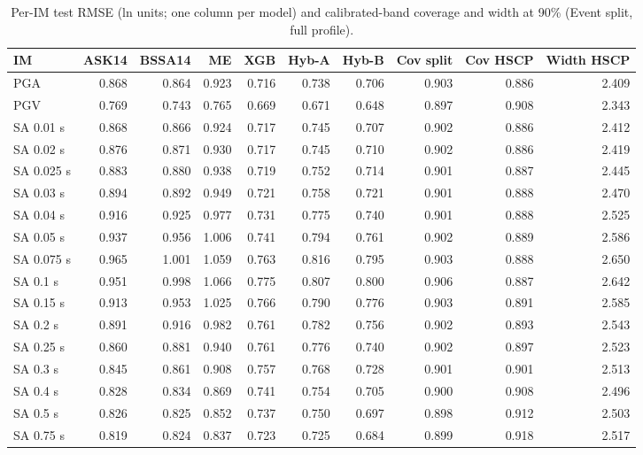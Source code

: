 \begin{table}[htbp]
\centering
\caption{Per-IM test RMSE (ln units; one column per model) and calibrated-band coverage and width at 90\% (Event split, full profile).}
\label{tab:tableS1_per_im_metrics}
\small
\begin{adjustbox}{max width=6.25in}
\begin{tabular}{lrrrrrrrrr}
\toprule
IM & ASK14 & BSSA14 & ME & XGB & Hyb-A & Hyb-B & Cov split & Cov HSCP & Width HSCP \\
\midrule
PGA & 0.868 & 0.864 & 0.923 & 0.716 & 0.738 & 0.706 & 0.903 & 0.886 & 2.409 \\
PGV & 0.769 & 0.743 & 0.765 & 0.669 & 0.671 & 0.648 & 0.897 & 0.908 & 2.343 \\
SA 0.01 s & 0.868 & 0.866 & 0.924 & 0.717 & 0.745 & 0.707 & 0.902 & 0.886 & 2.412 \\
SA 0.02 s & 0.876 & 0.871 & 0.930 & 0.717 & 0.745 & 0.710 & 0.902 & 0.886 & 2.419 \\
SA 0.025 s & 0.883 & 0.880 & 0.938 & 0.719 & 0.752 & 0.714 & 0.901 & 0.887 & 2.445 \\
SA 0.03 s & 0.894 & 0.892 & 0.949 & 0.721 & 0.758 & 0.721 & 0.901 & 0.888 & 2.470 \\
SA 0.04 s & 0.916 & 0.925 & 0.977 & 0.731 & 0.775 & 0.740 & 0.901 & 0.888 & 2.525 \\
SA 0.05 s & 0.937 & 0.956 & 1.006 & 0.741 & 0.794 & 0.761 & 0.902 & 0.889 & 2.586 \\
SA 0.075 s & 0.965 & 1.001 & 1.059 & 0.763 & 0.816 & 0.795 & 0.903 & 0.888 & 2.650 \\
SA 0.1 s & 0.951 & 0.998 & 1.066 & 0.775 & 0.807 & 0.800 & 0.906 & 0.887 & 2.642 \\
SA 0.15 s & 0.913 & 0.953 & 1.025 & 0.766 & 0.790 & 0.776 & 0.903 & 0.891 & 2.585 \\
SA 0.2 s & 0.891 & 0.916 & 0.982 & 0.761 & 0.782 & 0.756 & 0.902 & 0.893 & 2.543 \\
SA 0.25 s & 0.860 & 0.881 & 0.940 & 0.761 & 0.776 & 0.740 & 0.902 & 0.897 & 2.523 \\
SA 0.3 s & 0.845 & 0.861 & 0.908 & 0.757 & 0.768 & 0.728 & 0.901 & 0.901 & 2.513 \\
SA 0.4 s & 0.828 & 0.834 & 0.869 & 0.741 & 0.754 & 0.705 & 0.900 & 0.908 & 2.496 \\
SA 0.5 s & 0.826 & 0.825 & 0.852 & 0.737 & 0.750 & 0.697 & 0.898 & 0.912 & 2.503 \\
SA 0.75 s & 0.819 & 0.824 & 0.837 & 0.723 & 0.725 & 0.684 & 0.899 & 0.918 & 2.517 \\

\end{tabular}
\end{adjustbox}
\end{table}

